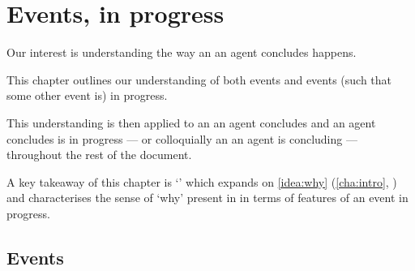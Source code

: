 \chapter{Events, in progress}
\label{cha:events-progress}


\begin{note}
  Our interest is understanding the way an  an agent concludes happens.

  This chapter outlines our understanding of both events and events (such that some other event is) in progress.

  This understanding is then applied to an  an agent concludes and  an agent concludes is in progress --- or colloquially an  an agent is concluding --- throughout the rest of the document.

  A key takeaway of this chapter is `\progEx{}' which expands on \autoref{idea:why} (\autoref{cha:intro}, ) and characterises the sense of `why' present in \qWhy{} in terms of features of an event in progress.
\end{note}


\section{Events}
\label{sec:events}

